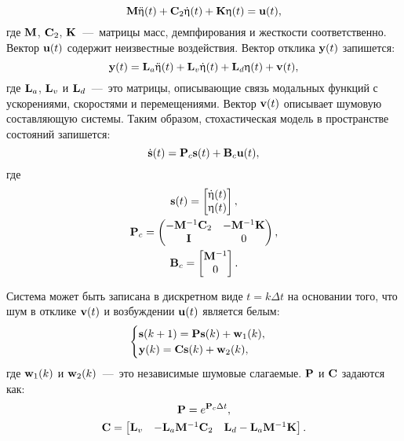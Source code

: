 \begin{equation}
	\mathbf{M} \ddot{\mathbf{\upeta}}(t) + \mathbf{C}_2 \dot{\mathbf{\upeta}}(t) + \mathbf{K} \upeta(t) = \mathbf{u}(t),
\end{equation}
где $ \mathbf{M} $, $ \mathbf{C}_2 $, $ \mathbf{K} $~---~матрицы масс, демпфирования и жесткости соответственно. Вектор $ \mathbf{u}(t) $ содержит неизвестные воздействия. Вектор отклика $ \mathbf{y}(t) $ запишется:
\begin{equation}
	\mathbf{y}(t) = \mathbf{L}_a \ddot{\mathbf{\upeta}}(t) + \mathbf{L}_v \dot{\mathbf{\upeta}}(t) + \mathbf{L}_d \upeta(t) + \mathbf{v}(t),
\end{equation}
где $ \mathbf{L}_a $, $ \mathbf{L}_v $ и $ \mathbf{L}_d $~---~это матрицы, описывающие связь модальных функций с ускорениями, скоростями и перемещениями. Вектор $ \mathbf{v}(t) $ описывает шумовую составляющую системы. Таким образом, стохастическая модель в пространстве состояний запишется:
\begin{equation}
	\dot{\mathbf{s}}(t) = \mathbf{P}_c \mathbf{s}(t) + \mathbf{B}_c \mathbf{u}(t), \label{eq:stochasticModelSSI}
\end{equation}
где 
\begin{gather}
	\mathbf{s}(t) = 
	\begin{bmatrix} 
		\dot{\mathbf{\upeta}}(t) \\ 
		\mathbf{\upeta}(t) 
	\end{bmatrix}, \\
	\mathbf{P}_c =
	\begin{pmatrix}
		-\mathbf{M} ^ {-1} \mathbf{C}_2 & -\mathbf{M} ^ {-1} \mathbf{K} \\
		 \mathbf{I} & 0
	\end{pmatrix}, \\
	\mathbf{B}_c = 
	\begin{bmatrix}
		\mathbf{M} ^ {-1} \\
		0	
	\end{bmatrix}.
\end{gather}

Система может быть записана в дискретном виде $ t = k \Delta t $ на основании того, что шум в отклике $ \mathbf{v}(t) $ и возбуждении $ \mathbf{u}(t) $ является белым:
\begin{equation}
	\begin{cases}
		\mathbf{s}(k + 1) = \mathbf{P} \mathbf{s}(k) + \mathbf{w}_1(k), \\
		\mathbf{y}(k) = \mathbf{C} \mathbf{s}(k) + \mathbf{w}_2(k),
	\end{cases}
\end{equation}
где $ \mathbf{w}_1(k) $ и $ \mathbf{w}_2(k) $~---~это независимые шумовые слагаемые. $ \mathbf{P} $ и $ \mathbf{C} $ задаются как:
\begin{gather}
	\mathbf{P} = e ^ {\mathbf{P}_c \Delta t}, \\
	\mathbf{C} = 
	\begin{bmatrix} 
		\mathbf{L}_v & -\mathbf{L}_a \mathbf{M} ^ {-1} \mathbf{C}_2 & \mathbf{L}_d - \mathbf{L}_a \mathbf{M} ^ {-1} \mathbf{K}
	\end{bmatrix}.
\end{gather}

